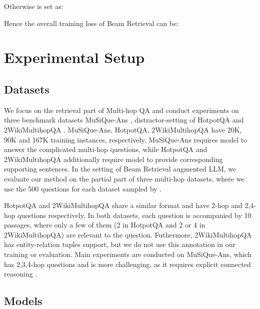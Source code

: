 \documentclass[10.5pt]{article}
\begin{document}
Otherwise  is set as:


Hence the overall training loss of Beam Retrieval can be:


\section{Experimental Setup}
\subsection{Datasets}
We focus on the retrieval part of Multi-hop QA and conduct experiments on three benchmark datasets MuSiQue-Ans \cite{musique}, distractor-setting of HotpotQA \cite{yang-etal-2018-hotpotqa} and 2WikiMultihopQA \cite{DBLP:journals/corr/abs-2011-01060}. MuSiQue-Ans, HotpotQA, 2WikiMultihopQA have 20K, 90K and 167K training instances, respectively. MuSiQue-Ans requires model to answer the complicated multi-hop questions, while HotpotQA and 2WikiMultihopQA additionally require model to provide corresponding supporting sentences. In the setting of Beam Retrieval augmented LLM, we evaluate our method on the partial part of three multi-hop datasets, where we use the 500 questions for each dataset sampled by \cite{trivedi-etal-2023-interleaving}. 

HotpotQA and 2WikiMultihopQA share a similar format and have 2-hop and 2,4-hop questions respectively. In both datasets, each question is accompanied by 10 passages, where only a few of them (2 in HotpotQA and 2 or 4 in 2WikiMultihopQA) are relevant to the question. Futhermore, 2WikiMultihopQA has entity-relation tuples support, but we do not use this annotation in our training or evaluation. Main experiments are conducted on MuSiQue-Ans, which has 2,3,4-hop questions and is more challenging, as it requires explicit connected reasoning \cite{musique}.





\subsection{Models}
\end{document}
